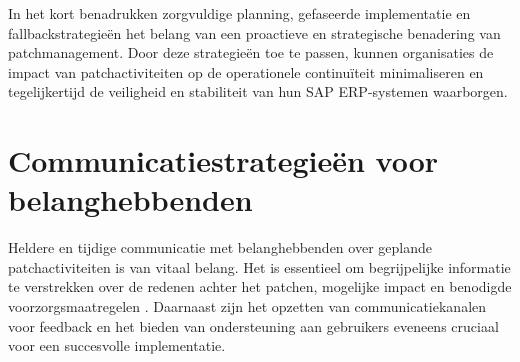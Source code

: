 In het kort benadrukken zorgvuldige planning, gefaseerde implementatie en fallbackstrategieën het belang van een proactieve en strategische benadering van patchmanagement. Door deze strategieën toe te passen, kunnen organisaties de impact van patchactiviteiten op de operationele continuïteit minimaliseren en tegelijkertijd de veiligheid en stabiliteit van hun SAP ERP-systemen waarborgen.

\section{Communicatiestrategieën voor belanghebbenden}
Heldere en tijdige communicatie met belanghebbenden over geplande patchactiviteiten is van vitaal belang. Het is essentieel om begrijpelijke informatie te verstrekken over de redenen achter het patchen, mogelijke impact en benodigde voorzorgsmaatregelen \autocite{Toren2019}. 
Daarnaast zijn het opzetten van communicatiekanalen voor feedback en het bieden van ondersteuning aan gebruikers eveneens cruciaal voor een succesvolle implementatie.

